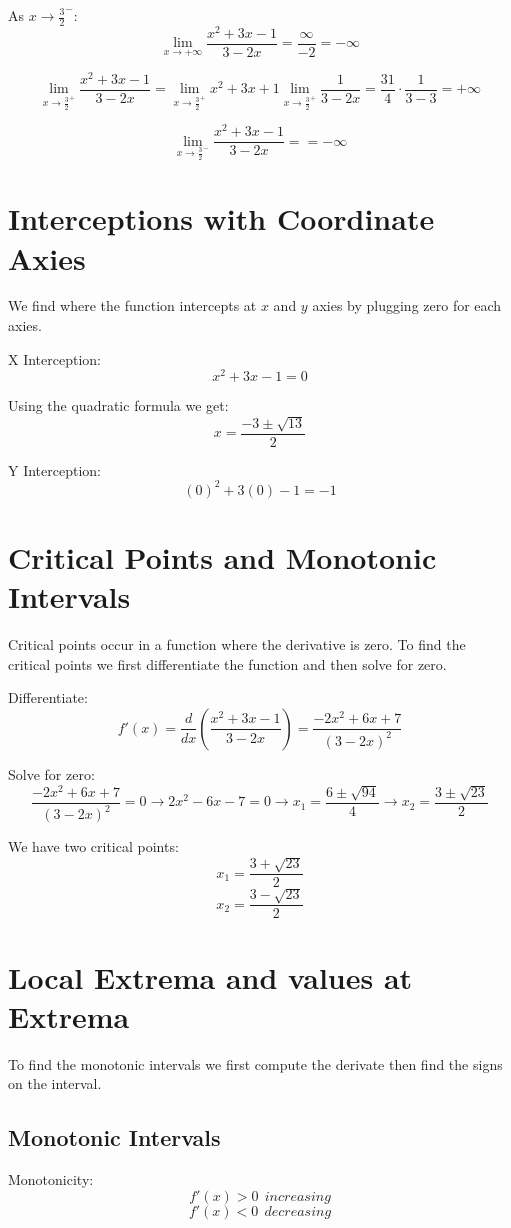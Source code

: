 \documentclass[11pt]{article}
\begin{document}
As \(x \to \frac{3}{2}^-\):
\[
\lim_{x \to +\infty} \frac{x^2+3x-1}{3-2x} = \frac{ \infty }{-2} = -\infty
\]

\[
\lim_{x\to\frac{3}{2}^+} \frac{x^2+3x-1}{3-2x} = \lim_{x\to\frac{3}{2}^+} x^2+3x+1 \lim_{x\to\frac{3}{2}^+} \frac{1}{3-2x} = \frac{31}{4} \cdot \frac{1}{3-3} = +\infty
\]

\[
\lim_{x\to\frac{3}{2}^-} \frac{x^2+3x-1}{3-2x} = = -\infty
\]
\section{Interceptions with Coordinate Axies}
\label{sec:org829a305}
We find where the function intercepts at \(x\) and \(y\) axies by plugging zero for each axies.

X Interception:
\[
x^2+3x-1=0
\]

Using the quadratic formula we get:
\[
x = \frac{-3 \pm \sqrt{13}}{2}
\]

Y Interception:
\[
(0)^2+3(0)-1 = -1
\]

\newpage
\section{Critical Points and Monotonic Intervals}
\label{sec:orgec6c75b}
Critical points occur in a function where the derivative is zero. To find the critical points we first differentiate the function and then solve for zero.

Differentiate:
\[
f'(x) = \frac{d}{dx} \left( \frac{x^2+3x-1}{3-2x} \right) = \frac{-2x^2+6x+7}{(3-2x)^2}
\]

Solve for zero:
\[
\frac{-2x^2+6x+7}{(3-2x)^2} = 0 \rightarrow 2x^2-6x-7=0 \rightarrow x_1 = \frac{6 \pm \sqrt{94}}{4} \rightarrow x_2 = \frac{3 \pm \sqrt{23}}{2}
\]

We have two critical points:
\[
x_1 = \frac{3 + \sqrt{23}}{2}
\]
\[
x_2 = \frac{3 - \sqrt{23}}{2}
\]
\section{Local Extrema and values at Extrema}
\label{sec:org1db5aa4}
To find the monotonic intervals we first compute the derivate then find the signs on the interval.
\subsection{Monotonic Intervals}
\label{sec:orga0d03a5}
Monotonicity:
\[
f'(x) > 0 \ \ increasing 
\]
\[
f'(x) < 0 \ \ decreasing
\]
\end{document}
